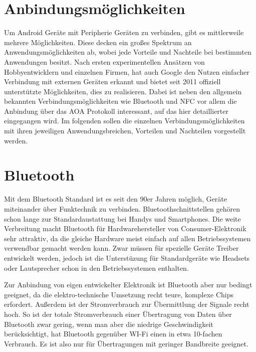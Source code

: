 \documentclass[12pt,journal,compsoc]{IEEEtran}
\begin{document}
\section{Anbindungsmöglichkeiten}
Um Android Geräte mit Peripherie Geräten zu verbinden, gibt es mittlerweile mehrere Möglichkeiten.
Diese decken ein großes Spektrum an Anwendungsmöglichkeiten ab, wobei jede Vorteile und Nachteile bei bestimmten Anwendungen besitzt.
Nach ersten experimentellen Ansätzen von Hobbyentwicklern und einzelnen Firmen, hat auch Google den Nutzen einfacher Verbindung mit externen Geräten 
erkannt und bietet seit 2011 offiziell unterstützte Möglichkeiten, dies zu realisieren.
Dabei ist neben den allgemein bekannten Verbindungsmöglichkeiten wie Bluetooth und NFC vor allem die Anbindung über das AOA Protokoll interessant, auf das hier detaillierter eingegangen wird.
Im folgenden sollen die einzelnen Verbindungsmöglichkeiten mit ihren jeweiligen Anwendungsbreichen, Vorteilen und Nachteilen vorgestellt werden.

\section{Bluetooth}
Mit dem Bluetooth Standard ist es seit den 90er Jahren möglich, Geräte miteinander über Funktechnik zu verbinden. Bluetoothschnittstellen gehören schon lange zur Standardaustattung bei Handys und Smartphones.
Die weite Verbreitung macht Bluetooth für Hardwarehersteller von Consumer-Elektronik sehr attraktiv, da die gleiche Hardware meist einfach auf allen Betriebssystemen verwendbar gemacht werden kann.
Zwar müssen für spezielle Geräte Treiber entwickelt werden, jedoch ist die Unterstüzung für Standardgeräte wie Headsets oder Lautsprecher schon in den Betriebssystemen enthalten.

Zur Anbindung von eigen entwickelter Elektronik ist Bluetooth aber nur bedingt geeignet, da die elektro-technische Umsetzung recht teure, komplexe Chips erfordert. Außerdem ist der Stromverbrauch zur Übermittlung der Signale recht hoch.
So ist der totale Stromverbrauch einer Übertragung von Daten über Bluetooth zwar gering, wenn man aber die niedrige Geschwindigkeit berücksichtigt, hat Bluetooth gegenüber WI-Fi einen in etwa 10-fachen Verbrauch.\cite{wireless}
Es ist also nur für Übertragungen mit geringer Bandbreite geeignet.
\end{document}
